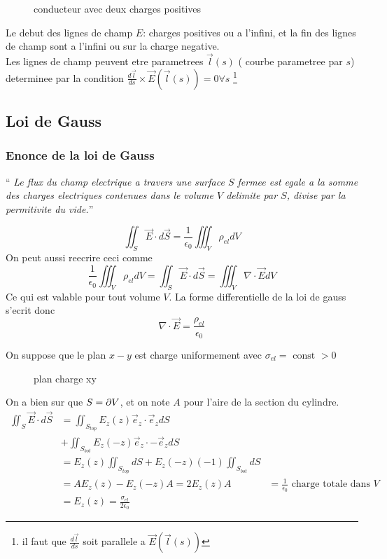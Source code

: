 \documentclass[../main.tex]{subfiles}
\begin{document}
\begin{figure}[H]
    \centering
    \caption{conducteur avec deux charges positives}
    \label{fig:conducteur-avec-deux-charges-positives}
\end{figure}
Le debut des lignes de champ $E$: charges positives ou a l'infini, et la fin des lignes de champ sont a l'infini ou sur la charge negative.\\
Les lignes de champ peuvent etre parametrees $\vec{l}( s) $ ( courbe parametree par $s$) determinee par la condition $ \frac{ d \vec{l}}{ ds}\times  \vec{E}( \vec{l}( s) ) = 0 \forall s$ \footnote { il faut que $\frac{d \vec{l}}{ds}$ soit parallele a $ \vec{E}( \vec{l}( s) ) $} 
\subsection{Loi de Gauss}
\subsubsection{Enonce de la loi de Gauss}
\begin{center}
``\textit{ Le flux du champ electrique a travers une surface $S$ fermee est egale a la somme des charges electriques contenues dans le volume $V$ delimite par $S$, divise par la permitivite du vide.}'' 
\end{center}
\[ 
\iint_S \vec{E} \cdot d \vec{S} = \frac{1}{\epsilon_0} \iiint_V \rho_{el} dV
\]
On peut aussi reecrire ceci comme
\[ 
	\frac{1}{\epsilon_0} \iiint_V \rho_{el} dV = \iint_S \vec{E}\cdot d\vec{S} = \iiint_V \nabla \cdot \vec{E} dV
\]
Ce qui est valable pour tout volume $V$. La forme differentielle de la loi de gauss s'ecrit donc
\[ 
	\nabla \cdot \vec{E} = \frac{\rho_{el} }{\epsilon_0}
\]
\begin{exemple}
On suppose que le plan $x-y$  est charge uniformement avec $\sigma_{el}  = \text{ const } >0$
\begin{figure}[H]
    \centering
   \caption{plan charge xy}
    \label{fig:plan-charge-xy}
\end{figure}
\end{exemple}
On a bien sur que $S= \partial V$, et on note $A$ pour l'aire de la section du cylindre.
\begin{align*}
	\iint_S \vec{E}\cdot d \vec{S}  &= \iint_{S_{top} } E_z( z)  \vec{e}_z \cdot \vec{e}_z d S\\
					&+ \iint_{S_{bot} } E_z( -z)  \vec{e}_z \cdot - \vec{e}_z d S\\
					&= E_z( z)  \iint_{S_{top} }  dS + E_z( -z) ( -1) \iint_{S_{bot} } dS\\
					&= A E_z( z) - E_z( -z) A = 2 E_z( z) A
&= \frac{1}{\epsilon_0} \text{ charge totale dans $V$ } \\
&= E_z( z) = \frac{\sigma_{el} }{2 \epsilon_{0}}
\end{align*}
\end{document}
